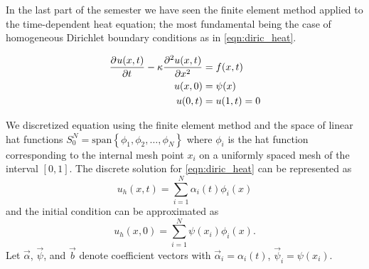 
In the last part of the semester we have seen the finite element method applied to the time-dependent heat equation; the most fundamental being the case of homogeneous Dirichlet boundary conditions as in \eqref{eqn:diric_heat}.

%
\begin{align}
\frac{\partial^{} u(x,t)}{\partial t^{}}  - \kappa \frac{\partial^{2} u(x,t)}{\partial x^{2}} &= f(x,t) \label{eqn:diric_heat}\\
u(x,0) &= \psi(x) \\
u(0,t)  &=  u(1,t)  = 0 
\end{align}

We discretized equation using the finite element method and the space of linear hat functions $S_{0}^{N} = \text{span}\left\{\phi_{1}, \phi_{2}, \ldots, \phi_{N} \right\} $ where $\phi_{i}$ is the hat function corresponding to the internal mesh point $x_i$ on a uniformly spaced mesh of the interval $[0,1]$.  The discrete solution for \eqref{eqn:diric_heat} can be represented as 
\[
u_{h}(x,t) = \sum_{i=1}^{N} \alpha_{i}(t)\phi_{i}(x)
\]
and the initial condition can be approximated as 
\[
u_h(x,0) = \sum_{i=1}^{N} \psi(x_i) \phi_{i}(x).
\]
Let $\vec{\alpha}$, $\vec{\psi}$, and $\vec{b}$ denote coefficient vectors with $\vec{\alpha}_{i} = \alpha_{i}(t)$, $\vec{\psi}_{i} = \psi(x_i)$.

